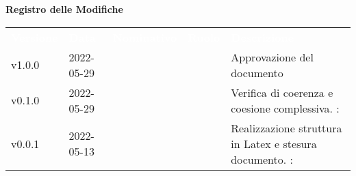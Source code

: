 

{\LARGE{\textbf{Registro delle Modifiche}}} \\
\begin{table}[!htbp]
	\renewcommand{\arraystretch}{1.5}
	\begin{tabular}{ m{}<{\centering}  m{}<{\centering}  m{}<{\centering}  m{}<{\centering}  m{}<{\centering} }
		\rowcolor{darkblue}
		\textcolor{white}{\textbf{Versione}} & \textcolor{white}{\textbf{Data}} & \textcolor{white}{\textbf{Nominativo}} & \textcolor{white}{\textbf{Ruolo}} & \textcolor{white}{\textbf{Descrizione}}                              \\
		v1.0.0                               & 2022-05-29                     &     \MG                                   & \RE                               & Approvazione del documento                                           \\

		v0.1.0                               & 2022-05-29                      & \GC                                    & \AN                               & Verifica di coerenza e coesione complessiva. \VE: \textit{\PV}          \\

		v0.0.1                               & 2022-05-13                       & \GC                                    & \AN                               & Realizzazione struttura in Latex e stesura documento. \VE: \textit{\PV} \\
	\end{tabular}
\end{table}

\pagebreak